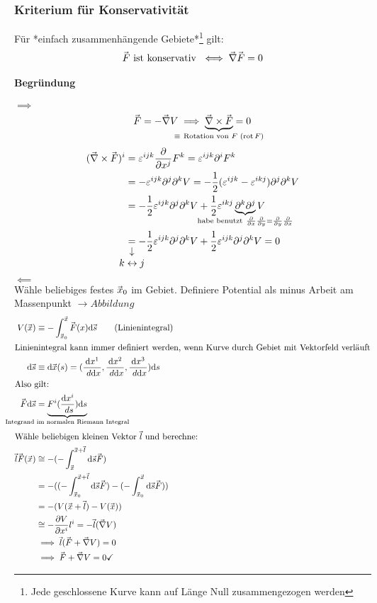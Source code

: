 \documentclass[a4paper]{scrartcl}
\DeclareMathOperator{\rot}{rot}
\renewcommand{\d}{\mathrm{d}}
\newcommand{\dd}[2]{\frac{\d #1}{\ d#2}}
\renewcommand{\v}[1]{\mathrlap{\vec{\mkern-2mu\phantom{#1}}}#1}
\theoremstyle{definition}
\theoremstyle{plain}
\theoremstyle{remark}
\theoremstyle{remark}
\begin{document}
\subsubsection{Kriterium für Konservativität}
\label{sec-4-3-2}
Für *einfach zusammenhängende Gebiete*\footnote{Jede geschlossene Kurve kann auf Länge Null zusammengezogen werden} gilt:
\[\v F ~\text{ist konservativ}~ \iff \v\nabla\v F = 0\]
\paragraph{Begründung}
\label{sec-4-3-2-1}
$\implies$ \\ \[\v F = -\v\nabla V \implies \underbrace{\v\nabla\times\v F}_{\mathclap{\equiv~\text{Rotation von $F$ ($\rot{F}$)}}} = 0\]
\begin{align*}
(\v\nabla\times\v F)^i &= \varepsilon^{ijk} \frac{\partial}{\partial x^j} F^k = \varepsilon^{ijk}\partial^i F^k \\
&= -\varepsilon^{ijk}\partial^j\partial^k V = -\frac{1}{2}(\varepsilon^{ijk} -\varepsilon^{ikj})\partial^j\partial^k V \\
&= - \frac{1}{2}\varepsilon^{ijk}\partial^j \partial^k V + \frac{1}{2}\varepsilon^{ikj}\underbrace{\partial^k\partial^j}_{\mathclap{\text{habe benutzt}~\frac{\partial}{\partial x}\frac{\partial}{\partial y} = \frac{\partial}{\partial y}\frac{\partial}{\partial x}}} V \\
&\underarrow[=]{$k \leftrightarrow j$} -\frac{1}{2}\varepsilon^{ijk}\partial^j\partial^k V + \frac{1}{2}\varepsilon^{ijk}\partial^j\partial^k V = 0
\end{align*}
$\impliedby$ \\
         Wähle beliebiges festes $\v x_0$ im Gebiet. Definiere Potential als minus Arbeit am Massenpunkt $\rightarrow Abbildung$
\begin{align*}
V(\v x) &\equiv -\int_{\v x_0}^{\v x} \v F(x)\d\v s \tag{Linienintegral} \\
\intertext{Linienintegral kann immer definiert werden, wenn Kurve durch Gebiet mit Vektorfeld verläuft}
\d\v s &\equiv \d\v x(s) =(\dd{x^1}{\d x}, \dd{x^2}{\d x}, \dd{x^3}{\d x}) \d s \\
\intertext{Also gilt:}
\v F\d\v s &= \underbrace{F^i (\dd{x^i}{s})\d s}_{\mathclap{\text{Integrand im normalen Riemann Integral}}} \\
\intertext{Wähle beliebigen kleinen Vektor $\v l$ und berechne:}
\v l \v F(\v x) &\cong -(-\int_{\v x}^{\v x + \v l} \d\v s \v F) \\
&= -((-\int_{\v x_0}^{\v x + \v l} \d \v s \v F) - ( -\int_{\v x_0}^{\v x} \d\v s \v F)) \\
&= -(V(\v x + \v l) -V(\v x)) \\
&\cong - \frac{\partial V}{\partial x^i}l^i = -\v l(\v\nabla V) \\
&\implies \v l(\v F + \v\nabla V) = 0 \\
&\implies \v F + \v\nabla V = 0 \checkmark
\end{align*}
\end{document}
